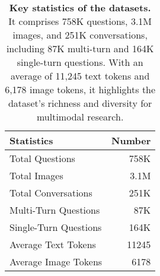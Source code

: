 \begin{table}[]
\small
\centering
\begin{tabular}{lr}
\toprule
Statistics & \multicolumn{1}{c}{Number} \\ \midrule
Total Questions       & 758K   \\
Total Images          & 3.1M   \\
Total Conversations   & 251K   \\ 
\midrule
Multi-Turn Questions  & 87K    \\
Single-Turn Questions & 164K   \\ 
\midrule
Average Text Tokens   & 11245  \\
Average Image Tokens  & 6178   \\ 
\bottomrule
\end{tabular}
\caption{\textbf{Key statistics of the {\dataname} datasets.}
It comprises 758K questions, 3.1M images, and 251K conversations, including 87K multi-turn and 164K single-turn questions. With an average of 11,245 text tokens and 6,178 image tokens, it highlights the dataset’s richness and diversity for multimodal research.
}
\label{tab:dataset_analysis}

\vspace{-3mm}

\end{table}
